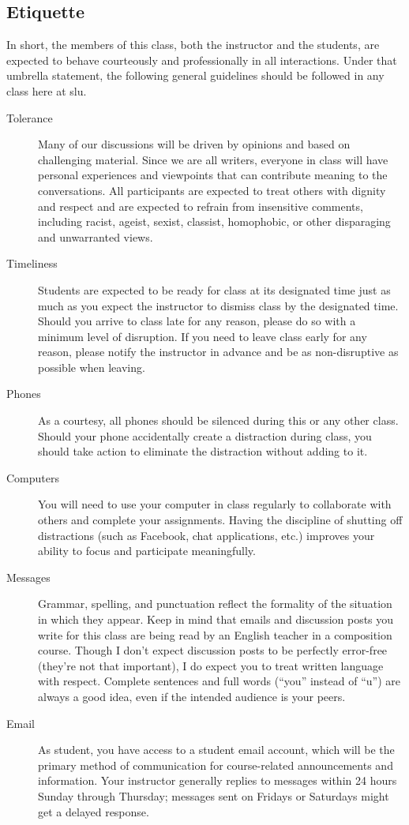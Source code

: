 \documentclass[12pt,oneside]{amsart}	%
\begin{document}
\subsection{Etiquette}
In short, the members of this class, both the instructor and the students, are expected to behave courteously and professionally in all interactions.  Under that umbrella statement, the following general guidelines should be followed in any class here at \ac{slu}.
	\begin{description}
	\item[Tolerance] Many of our discussions will be driven by opinions and based on challenging material.  Since we are all writers, everyone in class will have personal experiences and viewpoints that can contribute meaning to the conversations.  All participants are expected to treat others with dignity and respect and are expected to refrain from insensitive comments, including racist, ageist, sexist, classist, homophobic, or other disparaging and unwarranted views.
	\item[Timeliness] Students are expected to be ready for class at its designated time just as much as you expect the instructor to dismiss class by the designated time.  Should you arrive to class late for any reason, please do so with a minimum level of disruption.  If you need to leave class early for any reason, please notify the instructor in advance and be as non-disruptive as possible when leaving.
	\item[Phones] As a courtesy, all phones should be silenced during this or any other class. Should your phone accidentally create a distraction during class, you should take action to eliminate the distraction without adding to it.
	\item[Computers] You will need to use your computer in class regularly to collaborate with others and complete your assignments. Having the discipline of shutting off distractions (such as Facebook, chat applications, etc.) improves your ability to focus and participate meaningfully.
	\item[Messages] Grammar, spelling, and punctuation reflect the formality of the situation in which they appear.  Keep in mind that emails and discussion posts you write for this class are being read by an English teacher in a composition course.  Though I don't expect discussion posts to be perfectly error-free (they're not that important), I do expect you to treat written language with respect. Complete sentences and full words (``you'' instead of ``u'') are always a good idea, even if the intended audience is your peers.
	\item[Email] As  student, you have access to a student email account, which will be the primary method of communication for course-related announcements and information. Your instructor generally replies to messages within 24 hours Sunday through Thursday; messages sent on Fridays or Saturdays might get a delayed response.
	\end{description}
	
\end{document}
